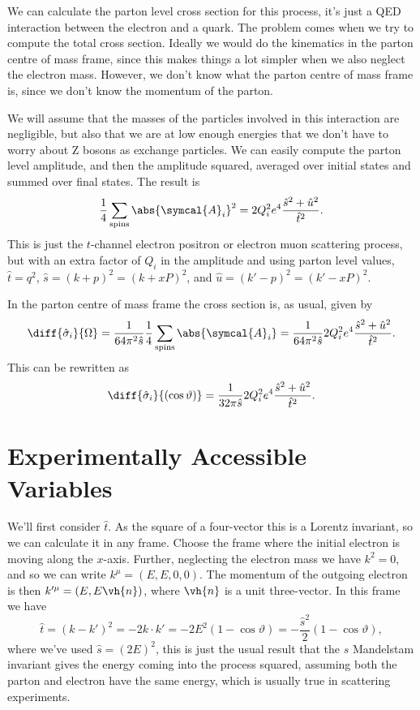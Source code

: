 \documentclass[fleqn]{NotesClass}
\newcommand{\Pparticle}[1]{\mathrm{#1}}
\newcommand{\PZ}{\ensuremath{\Pparticle{Z}}}
\newcommand{\amplitude}{\symcal{A}}
\begin{document}
    We can calculate the parton level cross section for this process, it's just a QED interaction between the electron and a quark.
    The problem comes when we try to compute the total cross section.
    Ideally we would do the kinematics in the parton centre of mass frame, since this makes things a lot simpler when we also neglect the electron mass.
    However, we don't know what the parton centre of mass frame is, since we don't know the momentum of the parton.
    
    We will assume that the masses of the particles involved in this interaction are negligible, but also that we are at low enough energies that we don't have to worry about \PZ{} bosons as exchange particles.
    We can easily compute the parton level amplitude, and then the amplitude squared, averaged over initial states and summed over final states.
    The result is
    \begin{equation}
        \frac{1}{4}\sum_{\text{spins}} \abs{\amplitude_i}^2 = 2Q_i^2 e^4 \frac{\hat{s}^2 + \hat{u}^2}{\hat{t}^2}.
    \end{equation}
    This is just the \(t\)-channel electron positron or electron muon scattering process, but with an extra factor of \(Q_i\) in the amplitude and using parton level values, \(\hat{t} = q^2\), \(\hat{s} = (k + p)^2 = (k + xP)^2\), and \(\hat{u} = (k' - p)^2 = (k' - xP)^2\).
    
    In the parton centre of mass frame the cross section is, as usual, given by
    \begin{equation}
        \diff{\hat{\sigma}_i}{\Omega} = \frac{1}{64\pi^2\hat{s}} \frac{1}{4}\sum_{\text{spins}} \abs{\amplitude_i} = \frac{1}{64\pi^2\hat{s}} 2Q_i^2 e^4 \frac{\hat{s}^2 + \hat{u}^2}{\hat{t}^2}.
    \end{equation}
    This can be rewritten as
    \begin{equation}
        \diff{\hat{\sigma}_i}{(\cos\vartheta)} = \frac{1}{32\pi\hat{s}}2Q_i^2 e^4\frac{\hat{s}^2 + \hat{u}^2}{\hat{t}^2}.
    \end{equation}
    
    \section{Experimentally Accessible Variables}
    We'll first consider \(\hat{t}\).
    As the square of a four-vector this is a Lorentz invariant, so we can calculate it in any frame.
    Choose the frame where the initial electron is moving along the \(x\)-axis.
    Further, neglecting the electron mass we have \(k^2 = 0\), and so we can write \(k^\mu = (E, E, 0, 0)\).
    The momentum of the outgoing electron is then \(k'^\mu = (E, E\vh{n})\), where \(\vh{n}\) is a unit three-vector.
    In this frame we have
    \begin{equation}
        \hat{t} = (k - k')^2 = -2k\cdot k' = -2E^2(1 - \cos\vartheta) = -\frac{\hat{s}^2}{2}(1 - \cos\vartheta),
    \end{equation}
    where we've used \(\hat{s} = (2E)^2\), this is just the usual result that the \(s\) Mandelstam invariant gives the energy coming into the process squared, assuming both the parton and electron have the same energy, which is usually true in scattering experiments.
    
\end{document}
